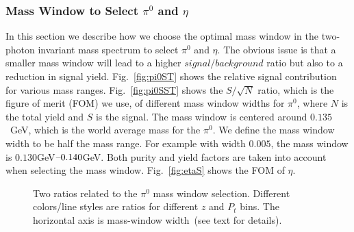 \subsubsection{\texorpdfstring{Mass Window to Select $\pi^0$ and $\eta$}{Mass Window to Select pi0 and eta}}
\label{sec:masswindow}
In this section we describe how we choose the optimal mass window in the two-photon invariant mass spectrum 
 to select $\pi^0$ and $\eta$. The obvious issue is that a smaller mass window will lead to a higher $signal/background$ ratio but also to a reduction in signal yield. Fig.~\ref{fig:pi0ST} shows the relative signal contribution for various mass ranges. Fig.~\ref{fig:pi0SST} shows the $S/\sqrt{N}$ ratio, which is the figure of merit (FOM) we use, of different mass window widths for $\pi^0$, where $N$ is the total yield and $S$ is the signal. The mass window is centered around $0.135$~GeV, which is the world average mass for the  $\pi^0$. We define the mass window width to be half  the mass range. For example with width $0.005$, the mass window is $0.130$GeV$\textup{--}0.140$GeV. Both purity and yield factors are taken into account when selecting the mass window. Fig.~\ref{fig:etaS} shows the FOM of $\eta$.
\begin{figure}[h]
\centering     %
{}
\caption{Two ratios related to the $\pi^0$ mass window selection. Different colors/line styles are ratios for different $z$ and $P_t$ bins. The horizontal axis is mass-window width~(see text for details).}
\label{fig:pi0S}
\end{figure}

